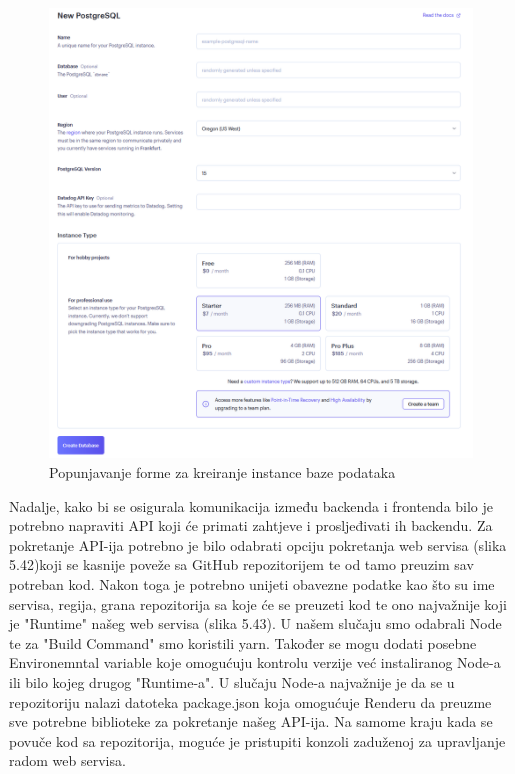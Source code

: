 				\begin{figure}[H]
					\centering
					\includegraphics[width=\textwidth]{slike/create_db_form.png}
					\caption{Popunjavanje forme za kreiranje instance baze podataka}
					\label{fig: Render create new DB}
				\end{figure}
				Nadalje, kako bi se osigurala komunikacija između backenda i frontenda bilo je potrebno napraviti API koji će primati zahtjeve i prosljeđivati ih backendu. Za pokretanje API-ija potrebno je bilo odabrati opciju pokretanja web servisa (slika 5.42)koji se kasnije poveže sa GitHub repozitorijem te od tamo preuzim sav potreban kod.
				Nakon toga je potrebno unijeti obavezne podatke kao što su ime servisa, regija, grana repozitorija sa koje će se preuzeti kod te ono najvažnije koji je "Runtime" našeg web servisa (slika 5.43). U našem slučaju smo odabrali Node te za "Build Command" smo koristili yarn. Također se mogu dodati posebne Environemntal variable koje omogućuju kontrolu verzije već instaliranog Node-a ili bilo kojeg drugog "Runtime-a". U slučaju Node-a najvažnije je da se u repozitoriju nalazi datoteka package.json koja omogućuje Renderu da preuzme sve potrebne biblioteke za pokretanje našeg API-ija.
				Na samome kraju kada se povuče kod sa repozitorija, moguće je pristupiti konzoli zaduženoj za upravljanje radom web servisa.
